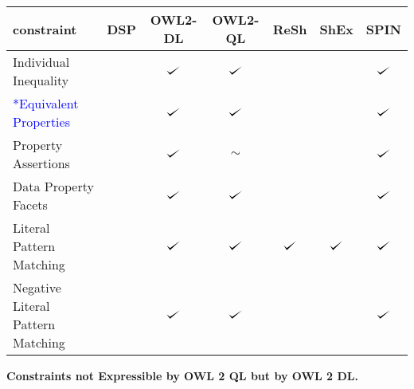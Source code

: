 \documentclass{llncs}
\def\checkmark{\tikz\fill[scale=0.4](0,.35) -- (.25,0) -- (1,.7) -- (.25,.15) -- cycle;}
\newenvironment{evaluation}{
  \scriptsize
  \sffamily
  \vspace{0.3cm}
  \begin{tabular}{l|c|c|c|c|c|c}
  \hline
  \textbf{constraint} & \textbf{DSP} & \textbf{OWL2-DL} & \textbf{OWL2-QL} & \textbf{ReSh} & \textbf{ShEx} & \textbf{SPIN} \\
  \hline

}{
  \hline
  \end{tabular}
  \linebreak
}
\begin{document}
\begin{evaluation}
Individual Inequality & \ding{55} & $\checkmark$ & $\checkmark$ & \ding{55} & \ding{55} & $\checkmark$ \\
\textcolor{blue}{*Equivalent Properties} & \ding{55} & $\checkmark$ & $\checkmark$ & \ding{55} & \ding{55} & $\checkmark$ \\
Property Assertions & \ding{55} & $\checkmark$ & $\sim$ & \ding{55} & \ding{55} & $\checkmark$ \\
Data Property Facets & \ding{55} & $\checkmark$ & $\checkmark$ & \ding{55} & \ding{55} & $\checkmark$ \\
Literal Pattern Matching & \ding{55} & $\checkmark$ & $\checkmark$ & $\checkmark$ & $\checkmark$ & $\checkmark$ \\
Negative Literal Pattern Matching & \ding{55} & $\checkmark$ & $\checkmark$ & & & $\checkmark$ \\
\end{evaluation}

\textbf{Constraints not Expressible by OWL 2 QL but by OWL 2 DL.}
\end{document}
